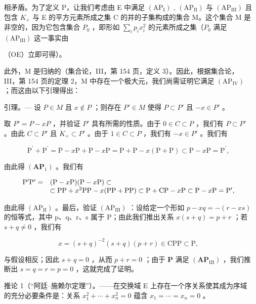 相矛盾。为了定义 P，让我们考虑由 E 中满足 \((\mathrm{AP}_{\mathrm{I}})\) , \((\mathrm{AP}_{\mathrm{II}})\) 与 \((\mathrm{AP}_{\mathrm{III}})\) 且包含 \(K_{+}\) 与 E 的平方元素所成之集 C 的并的子集构成的集合 M。这个集合 M 是非空的，因为它包含集合 \(P_{0}\) ，即形如 \(\sum_{i} p_{i} x_{i}^{2}\) 的元素所成之集（\(P_{0}\) 满足 \((\mathrm{AP}_{\mathrm{III}})\) 这一事实由

（OE）立即可得）。

此外，M 是归纳的（集合论，III，第 154 页，定义 3）。因此，根据集合论，III，第 154 页的定理 2，M 中存在一个极大元，我们尚需证明它满足 \((\mathrm{AP}_{\mathrm{IV}})\) ；而这由以下引理得出：

引理。--- 设 \(P \in M\) 且 \(x \notin P\) ；则存在 \(P' \in M\) 使得 \(P \subset P'\) 且 \(-x \in P'\) 。

取 \(P' = P - xP\) ，并验证 \(P'\) 具有所需的性质。由于 \(0 \in C \subset P\) ，我们有 \(P \subset P'\) 。由此 \(C \subset P'\) 且 \(K_{+} \subset P'\) 。由于 \(1 \in C \subset P\) ，我们有 \(-x \in P'\) 。我们有

\[
\mathrm{P} ^ {\prime} + \mathrm{P} ^ {\prime} = \mathrm{P} - x \mathrm{P} + \mathrm{P} - x \mathrm{P} = \mathrm{P} + \mathrm{P} - x (\mathrm{P} + \mathrm{P}) \subset \mathrm{P} - x \mathrm{P} = \mathrm{P} ^ {\prime},
\]

由此得 \((\mathbf{AP}_1)\) 。我们有

\[
\begin{array}{r l} \mathrm {P^ {\prime} P^ {\prime}} = & (\mathrm{P} - x \mathrm{P}) (\mathrm{P} - x \mathrm{P}) \subset \\ & \subset \mathrm{PP} + x ^ {2} \mathrm{PP} - x (\mathrm{PP} + \mathrm{PP}) \subset \mathrm{P} + \mathrm{CP} - x \mathrm{P} \subset \mathrm{P} - x \mathrm{P} = \mathrm {P^ {\prime}}, \end{array}
\]

由此得 \((\mathrm{AP}_{\mathrm{II}})\) 。最后，验证 \((\mathrm{AP}_{\mathrm{III}})\) ：设给定一个形如 \(p - xq = -(r - xs)\) 的恒等式，其中 p、q、r、s 属于 P；由此我们推出关系 \(x(s + q) = p + r\) ；若 \(s + q \neq 0\) ，我们有

\[
x = (s + q) ^ {- 2} (s + q) (p + r) \in \mathrm{CPP} \subset \mathrm{P},
\]

与假设相反；因此 \(s + q = 0\) ，从而 \(p + r = 0\) ；由于 \(\mathbf{P}\) 满足 \((\mathbf{AP}_{\mathrm{III}})\) ，我们推断出 \(s = q = r = p = 0\) ，这就完成了证明。

推论 1（“阿廷–施赖尔定理”）。——在交换域 E 上存在一个序关系使其成为序域的充分必要条件是：关系 \(x_{1}^{2} + \cdots + x_{n}^{2} = 0\) 蕴含 \(x_{1} = \cdots = x_{n} = 0\) 。

